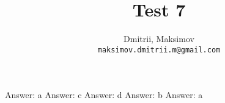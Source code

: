 \documentclass{homework}
\title{Test 7}
\author{
  Dmitrii, Maksimov\\
  \texttt{maksimov.dmitrii.m@gmail.com}
}
\begin{document}
\maketitle

\exercise*
Answer: a
\exercise*
Answer: c
\exercise*
Answer: d
\exercise*
Answer: b
\exercise*
Answer: a
\end{document}
